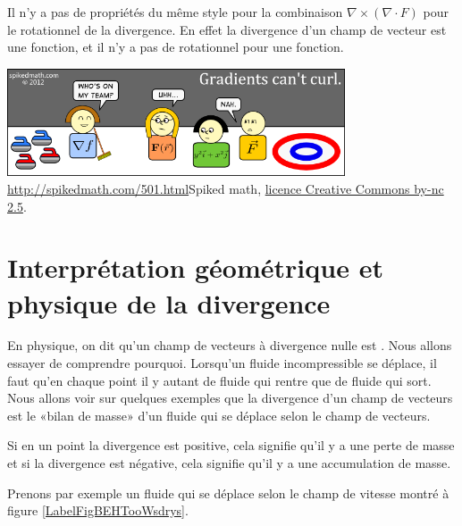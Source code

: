 \begin{remark}
    Il n'y a pas de propriétés du même style pour la combinaison $\nabla\times(\nabla\cdot F)$ pour le rotationnel de la divergence. En effet la divergence d'un champ de vecteur est une fonction, et il n'y a pas de rotationnel pour une fonction.
\end{remark}

{
\begin{center}
            \includegraphics[width=10cm]{pictures_bitmap/501-curling-with-gradients.png}\\
        \url{http://spikedmath.com/501.html}{Spiked math}, \href{http://creativecommons.org/licenses/by-nc-sa/2.5/ca/}{licence Creative Commons by-nc 2.5}.
\end{center}
}{}

\section[Interprétation de la divergence]{Interprétation géométrique et physique de la divergence}

En physique, on dit qu'un champ de vecteurs à divergence nulle est . Nous allons essayer de comprendre pourquoi. Lorsqu'un fluide incompressible se déplace, il faut qu'en chaque point il y autant de fluide qui rentre que de fluide qui sort. Nous allons voir sur quelques exemples que la divergence d'un champ de vecteurs est le «bilan de masse» d'un fluide qui se déplace selon le champ de vecteurs.

Si en un point la divergence est positive, cela signifie qu'il y a une perte de masse et si la divergence est négative, cela signifie qu'il y a une accumulation de masse.

Prenons par exemple un fluide qui se déplace selon le champ de vitesse montré à figure \ref{LabelFigBEHTooWsdrys}. %
\newcommand{\CaptionFigBEHTooWsdrys}{Le champ de vecteurs $F(x,y)=\frac{1}{ x }(1,0)$.}


